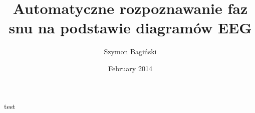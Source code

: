 \documentclass[12pt]{article}
\title{Automatyczne rozpoznawanie faz snu na podstawie diagramów EEG}
\author{Szymon Bagiński}
\date{February 2014}
\begin{document}
    test
\end{document}
